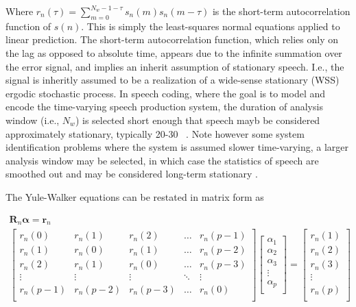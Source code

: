 \noindent
Where $r_n(\tau) = \sum_{m=0}^{N_w-1-\tau}s_n(m)s_n(m-\tau)$ is the short-term autocorrelation function of $s(n)$. This is simply the least-squares normal equations applied to linear prediction. The short-term autocorrelation function, which relies only on the lag as opposed to absolute time, appears due to the infinite summation over the error signal, and implies an inherit assumption of stationary speech. I.e., the signal is inheritly assumed to be a realization of a wide-sense stationary (WSS) ergodic stochastic process. In speech coding, where the goal is to model and encode the time-varying speech production system, the duration of analysis window (i.e., $N_w$) is selected short enough that speech mayb be considered approximately stationary, typically 20-30 \unit{\milli\sec}. Note however some system identification problems where the system is assumed slower time-varying, a larger analysis window may be selected, in which case the statistics of speech are smoothed out and may be considered long-term stationary \citep{gazor2003speech}.

The Yule-Walker equations can be restated in matrix form as

\begin{eqnarray}
	\boldsymbol{R}_n \boldsymbol{\alpha} = \boldsymbol{r}_n \\
   	\begin{bmatrix} 
	   	r_n(0)    & r_n(1)      & r_n(2)     & \dots     & r_n(p-1)  \\
	   	r_n(1)     & r_n(0)      & r_n(1)     & \dots     & r_n(p-2)  \\
	   	r_n(2)     & r_n(1)      & r_n(0)     & \dots     & r_n(p-3)  \\
	   	\vdots     & \vdots      & \vdots     & \ddots  & \vdots  \\
	   	r_n(p-1)  & r_n(p-2)  & r_n(p-3) & \dots    & r_n(0)  \\
	\end{bmatrix} 
	\begin{bmatrix}
		\alpha_1 \\
		\alpha_2 \\
		\alpha_3 \\
		\vdots    \\
		\alpha_p \\
	\end{bmatrix}
	=
	\begin{bmatrix}
		r_n(1)  \\
		r_n(2) \\
		r_n(3) \\
		\vdots    \\
		r_n(p) \\
\end{bmatrix}
\end{eqnarray}

